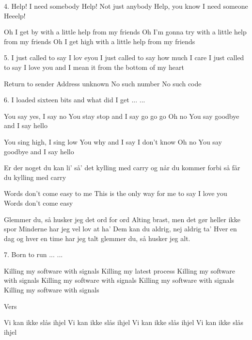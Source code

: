 \documentclass[a4paper,11pt]{article}
\begin{document}
\begin{song}
4.
Help!  I need somebody
Help!  Not just anybody
Help, you know I need someone
Heeelp!

Oh I get by with a little help from my friends
Oh I'm gonna try with a little help from my friends
Oh I get high with a little help from my friends

5.
I just called to say I lov eyou
I just called to say how much I care
I just called to say I love you
and I mean it from the bottom of my heart

Return to sender
Address unknown
No such number
No such code

6.
I loaded sixteen bits
and what did I get
...
...

You say yes, I say no
You stay stop and I say go go go
Oh no
You say goodbye and I say hello

You sing high, I sing low
You why and I say I don't know
Oh no
You say goodbye and I say hello

Er der noget du kan li'
så' det kylling med carry
og når du kommer forbi
så får du kylling med carry

Words don't come easy to me
This is the only way for me to say
I love you
Words don't come easy

Glemmer du, så husker jeg det ord for ord
Alting brast, men det gør heller ikke spor
Minderne har jeg vel lov at ha'
Dem kan du aldrig, nej aldrig ta'
Hver en dag og hver en time har jeg talt
glemmer du, så husker jeg alt.

7.
Born to run
...
...

Killing my software with signals
Killing my latest process
Killing my software with signals
Killing my software with signals
Killing my software with signals
Killing my software with signals

Vers

Vi kan ikke slås ihjel
Vi kan ikke slås ihjel
Vi kan ikke slås ihjel
Vi kan ikke slås ihjel

\end{song}
\end{document}
